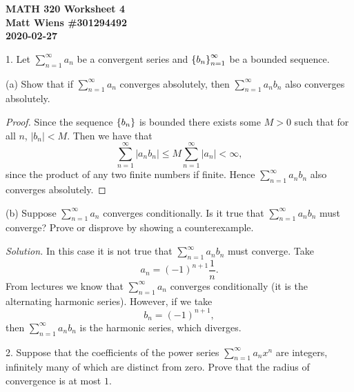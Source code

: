 \documentclass{article}
\begin{document}
\textbf{MATH 320 Worksheet 4} \\
\textbf{Matt Wiens \#301294492} \\
\textbf{2020-02-27}

1. Let $\sum_{n = 1}^\infty a_n$ be a convergent series and
   $\cbr{b_n}_{n = 1}^\infty$ be a bounded sequence.

(a) Show that if $\sum_{n = 1}^\infty a_n$ converges absolutely, then
$\sum_{n = 1}^\infty a_n b_n$ also converges absolutely.

\begin{proof}

Since the sequence $\cbr{b_n}$ is bounded there exists some $M > 0$ such
that for all $n$, $|b_n| < M$. Then we have that
%
\begin{equation*}
    \sum_{n = 1}^\infty | a_n b_n |
        \leq M \sum_{n = 1}^\infty | a_n |
        < \infty
        ,
\end{equation*}
%
since the product of any two finite numbers if finite. Hence $\sum_{n =
1}^\infty a_n b_n$ also converges absolutely.

\end{proof}

(b) Suppose $\sum_{n = 1}^\infty a_n$ converges conditionally. Is it
true that $\sum_{n = 1}^\infty a_n b_n$ must converge? Prove or disprove
by showing a counterexample.

\textit{Solution.}
In this case it is not true that $\sum_{n = 1}^\infty a_n b_n$ must converge.
Take
%
\begin{equation*}
    a_n = (-1)^{n + 1} \frac{1}{n}
    .
\end{equation*}
%
From lectures we know that $\sum_{n = 1}^\infty a_n$ converges
conditionally (it is the alternating harmonic series). However, if we
take
%
\begin{equation*}
    b_n = (-1)^{n + 1}
    ,
\end{equation*}
%
then $\sum_{n = 1}^\infty a_n b_n$ is the harmonic series, which
diverges.

\newpage

2. Suppose that the coefficients of the power series $\sum_{n =
   1}^\infty a_n x^n$ are integers, infinitely many of which are
   distinct from zero. Prove that the radius of convergence is at most
   $1$.
\end{document}
